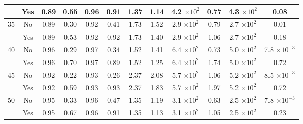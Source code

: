 \begin{tabular}{cccccccccccc}
 & Yes & 0.89 & 0.55 & 0.96 & 0.91 & 1.37 & 1.14 & 4.2 $\times 10^{2}$ & 0.77 & 4.3 $\times 10^{2}$ & 0.08 \\
\midrule
\multirow{2}{*}{35} & No & 0.89 & 0.30 & 0.92 & 0.41 & 1.73 & 1.52 & 2.9 $\times 10^{2}$ & 0.79 & 2.7 $\times 10^{2}$ & 0.01 \\
 & Yes & 0.89 & 0.53 & 0.92 & 0.92 & 1.73 & 1.40 & 2.9 $\times 10^{2}$ & 1.06 & 2.7 $\times 10^{2}$ & 0.18 \\
\midrule
\multirow{2}{*}{40} & No & 0.96 & 0.29 & 0.97 & 0.34 & 1.52 & 1.41 & 6.4 $\times 10^{2}$ & 0.73 & 5.0 $\times 10^{2}$ & 7.8 $\times 10^{-3}$ \\
 & Yes & 0.96 & 0.70 & 0.97 & 0.89 & 1.52 & 1.25 & 6.4 $\times 10^{2}$ & 1.74 & 5.0 $\times 10^{2}$ & 0.72 \\
\midrule
\multirow{2}{*}{45} & No & 0.92 & 0.22 & 0.93 & 0.26 & 2.37 & 2.08 & 5.7 $\times 10^{2}$ & 1.06 & 5.2 $\times 10^{2}$ & 8.5 $\times 10^{-3}$ \\
 & Yes & 0.92 & 0.59 & 0.93 & 0.93 & 2.37 & 1.83 & 5.7 $\times 10^{2}$ & 1.97 & 5.2 $\times 10^{2}$ & 0.72 \\
\midrule
\multirow{2}{*}{50} & No & 0.95 & 0.33 & 0.96 & 0.47 & 1.35 & 1.19 & 3.1 $\times 10^{2}$ & 0.63 & 2.5 $\times 10^{2}$ & 7.8 $\times 10^{-3}$ \\
 & Yes & 0.95 & 0.67 & 0.96 & 0.91 & 1.35 & 1.13 & 3.1 $\times 10^{2}$ & 1.05 & 2.5 $\times 10^{2}$ & 0.23 \\
\bottomrule
\end{tabular}
